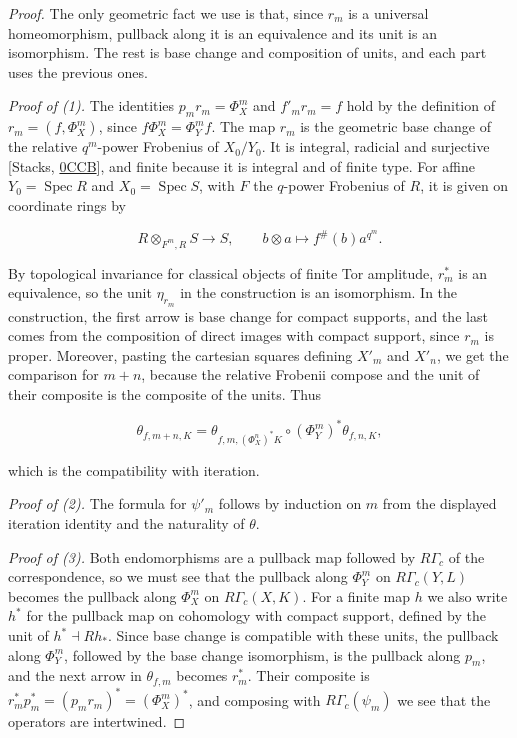 \documentclass[11pt]{article}
\begin{document}
\begin{proof}[{Proof}]\label{bp281}%
The only geometric fact we use is that, since \(r_m\) is a universal homeomorphism, pullback along it is an equivalence and its unit is an isomorphism. The rest is base change and composition of units, and each part uses the previous ones.

\emph{Proof of (1).} The identities \(p_mr_m=\Phi_X^m\) and \(f'_mr_m=f\) hold by the definition of \(r_m=(f,\Phi_X^m)\), since \(f\Phi_X^m=\Phi_Y^mf\). The map \(r_m\) is the geometric base change of the relative \(q^m\)-power Frobenius of \(X_0/Y_0\). It is integral, radicial and surjective [Stacks, \href{https://stacks.math.columbia.edu/tag/0CCB}{0CCB}], and finite because it is integral and of finite type. For affine \(Y_0=\operatorname{Spec}R\) and \(X_0=\operatorname{Spec}S\), with \(F\) the \(q\)-power Frobenius of \(R\), it is given on coordinate rings by

\[
R\otimes_{F^m,R}S\longrightarrow S,
\qquad b\otimes a\longmapsto f^\#(b)a^{q^m}.
\]

By topological invariance for classical objects of finite Tor amplitude, \(r_m^*\) is an equivalence, so the unit \(\eta_{r_m}\) in the construction is an isomorphism. In the construction, the first arrow is base change for compact supports, and the last comes from the composition of direct images with compact support, since \(r_m\) is proper. Moreover, pasting the cartesian squares defining \(X'_m\) and \(X'_n\), we get the comparison for \(m+n\), because the relative Frobenii compose and the unit of their composite is the composite of the units. Thus

\[
\theta_{f,m+n,K}=
\theta_{f,m,(\Phi_X^n)^*K}\circ
(\Phi_Y^m)^*\theta_{f,n,K},
\]

which is the compatibility with iteration.

\emph{Proof of (2).} The formula for \(\psi'_m\) follows by induction on \(m\) from the displayed iteration identity and the naturality of \(\theta\).

\emph{Proof of (3).} Both endomorphisms are a pullback map followed by \(R\Gamma_c\) of the correspondence, so we must see that the pullback along \(\Phi_Y^m\) on \(R\Gamma_c(Y,L)\) becomes the pullback along \(\Phi_X^m\) on \(R\Gamma_c(X,K)\). For a finite map \(h\) we also write \(h^*\) for the pullback map on cohomology with compact support, defined by the unit of \(h^*\dashv Rh_*\). Since base change is compatible with these units, the pullback along \(\Phi_Y^m\), followed by the base change isomorphism, is the pullback along \(p_m\), and the next arrow in \(\theta_{f,m}\) becomes \(r_m^*\). Their composite is \(r_m^*p_m^*=(p_mr_m)^*=(\Phi_X^m)^*\), and composing with \(R\Gamma_c(\psi_m)\) we see that the operators are intertwined.


\end{proof}
\end{document}
